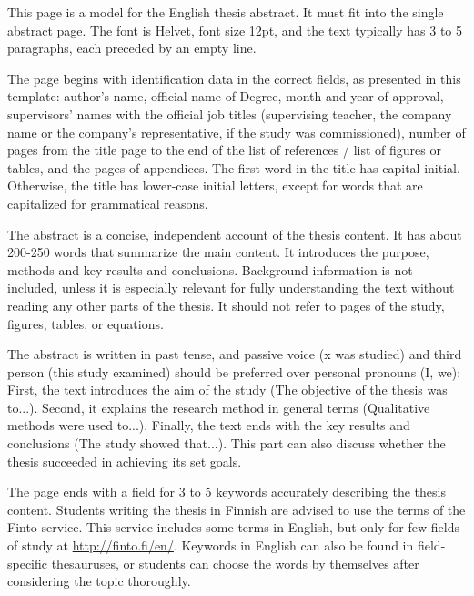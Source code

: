 This page is a model for the English thesis abstract.
It must fit into the single abstract page.
The font is Helvet, font size 12pt, and the text typically has 3 to 5 paragraphs, each preceded by an empty line.

The page begins with identification data in the correct fields, as presented in this template: author’s name, official name of Degree, month and year of approval, supervisors’ names with the official job titles (supervising teacher, the company name or the company’s representative, if the study was commissioned), number of pages from the title page to the end of the list of references / list of figures or tables, and the pages of appendices.
The first word in the title has capital initial.
Otherwise, the title has lower-case initial letters, except for words that are capitalized for grammatical reasons.

The abstract is a concise, independent account of the thesis content.
It has about 200-250 words that summarize the main content.
It introduces the purpose, methods and key results and conclusions.
Background information is not included, unless it is especially relevant for fully understanding the text without reading any other parts of the thesis.
It should not refer to pages of the study, figures, tables, or equations.

The abstract is written in past tense, and passive voice (x was studied) and third person (this study examined) should be preferred over personal pronouns (I, we): First, the text introduces the aim of the study (The objective of the thesis was to...).
Second, it explains the research method in general terms (Qualitative methods were used to...).
Finally, the text ends with the key results and conclusions (The study showed that...).
This part can also discuss whether the thesis succeeded in achieving its set goals. 

The page ends with a field for 3 to 5 keywords accurately describing the thesis content.
Students writing the thesis in Finnish are advised to use the terms of the Finto service.
This service includes some terms in English, but only for few fields of study at \url{http://finto.fi/en/}.
Keywords in English can also be found in field-specific thesauruses, or students can choose the words by themselves after considering the topic thoroughly.
